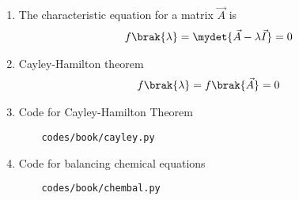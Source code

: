 \begin{enumerate}[label=\thesubsection.\arabic*.,ref=\thesubsection.\theenumi]
	\item 
The characteristic equation for a matrix $\vec{A}$ is 
\begin{align}
\label{eq:chareq}
	f\brak{\lambda} =\mydet{\vec{A}-\lambda \vec{I}}=0
\end{align}
\item Cayley-Hamilton theorem
\begin{align}
\label{eq:cayley}
	f\brak{\lambda}=f\brak{\vec{A}} = 0
\end{align}
\item Code for Cayley-Hamilton Theorem
	\begin{lstlisting}
	codes/book/cayley.py
\end{lstlisting}
\item Code for balancing chemical equations
	\begin{lstlisting}
	codes/book/chembal.py
\end{lstlisting}
\end{enumerate}

